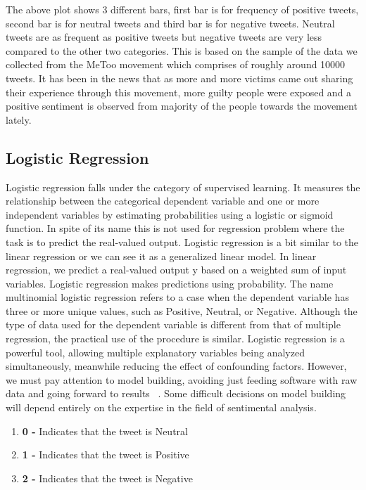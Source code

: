 The above plot shows 3 different bars, first bar is for frequency of positive 
tweets, second bar is for neutral tweets and third bar is for negative tweets. 
Neutral tweets are as frequent as positive tweets but negative tweets are very 
less compared to the other two categories. This is based on the sample of the 
data we collected from the MeToo movement which comprises of roughly around 
10000 tweets. It has been in the news that as more and more victims came 
out sharing their experience through this movement, more guilty people were 
exposed and a positive sentiment is observed from majority of the people 
towards the movement lately. 


\subsection{Logistic Regression}
Logistic regression falls under the category of supervised learning. It measures 
the relationship between the categorical dependent variable and one or 
more independent variables by estimating probabilities using a 
logistic or sigmoid function. In spite of its name this is not 
used for regression problem where the task is to predict the 
real-valued output. Logistic regression is a bit similar to the linear 
regression or we can see it as a generalized linear model. In linear regression,
 we predict a real-valued output y based on a weighted sum of input variables. 
Logistic regression makes predictions using probability.  The name 
multinomial logistic regression refers to a case when the dependent variable 
has three or more unique values, such as Positive, Neutral, or Negative. 
Although the type of data used for the dependent variable is different from 
that of multiple regression, the practical use of the procedure 
is similar. Logistic regression is a powerful tool, allowing multiple explanatory 
variables being analyzed simultaneously, meanwhile reducing the 
effect of confounding factors. However, we must pay attention to model 
building, avoiding just feeding software with raw data and going forward 
to results ~\cite{hid-sp18-418-regression}. Some difficult decisions on model 
building will depend entirely on the expertise in the field of sentimental 
analysis.

\begin{enumerate}
\item \textbf{0 - } 
Indicates that the tweet is Neutral
\item \textbf{1 - } 
Indicates that the tweet is Positive
\item \textbf{2 - } 
Indicates that the tweet is Negative
\end{enumerate}
